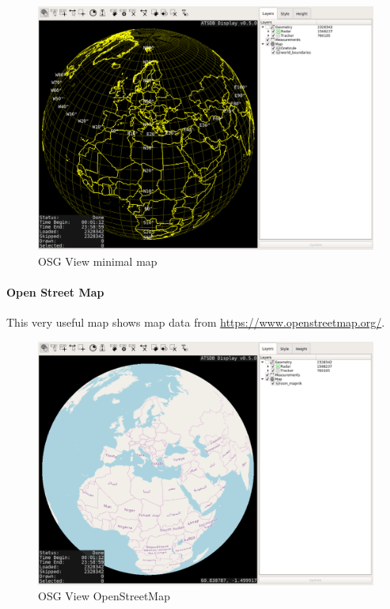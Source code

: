 \begin{figure}[H]
    \hspace*{-2.5cm}
    \includegraphics[width=19cm,frame]{../screenshots/osgview_minimal.png}
  \caption{OSG View minimal map}
\end{figure}

\newpage
\paragraph{Open Street Map}

This very useful map shows map data from \url{https://www.openstreetmap.org/}.

\begin{figure}[H]
    \hspace*{-2.5cm}
    \includegraphics[width=19cm,frame]{../screenshots/osgview_osm.png}
  \caption{OSG View OpenStreetMap}
\end{figure}

